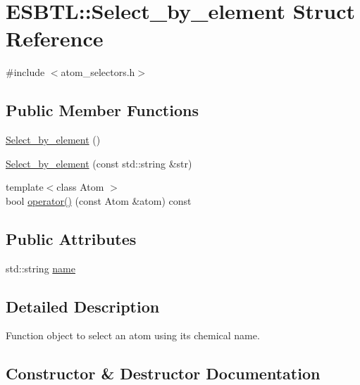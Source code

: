 \hypertarget{structESBTL_1_1Select__by__element}{}\section{E\+S\+B\+TL\+:\+:Select\+\_\+by\+\_\+element Struct Reference}
\label{structESBTL_1_1Select__by__element}


{\ttfamily \#include $<$atom\+\_\+selectors.\+h$>$}

\subsection*{Public Member Functions}
\begin{DoxyCompactItemize}
\item 
\hyperlink{structESBTL_1_1Select__by__element_a0570515ff47094a75babaad557c3243c}{Select\+\_\+by\+\_\+element} ()
\item 
\hyperlink{structESBTL_1_1Select__by__element_acd75ba745548ee3cad366710385677e8}{Select\+\_\+by\+\_\+element} (const std\+::string \&str)
\item 
{\footnotesize template$<$class Atom $>$ }\\bool \hyperlink{structESBTL_1_1Select__by__element_a2503f0b1dd84e165bb82ec4333f2eb6a}{operator()} (const Atom \&atom) const
\end{DoxyCompactItemize}
\subsection*{Public Attributes}
\begin{DoxyCompactItemize}
\item 
std\+::string \hyperlink{structESBTL_1_1Select__by__element_a921e6fd868ecdd16e14722dba0c16591}{name}
\end{DoxyCompactItemize}


\subsection{Detailed Description}
Function object to select an atom using its chemical name. 

\subsection{Constructor \& Destructor Documentation}
\mbox{\label{structESBTL_1_1Select__by__element_a0570515ff47094a75babaad557c3243c}} 
